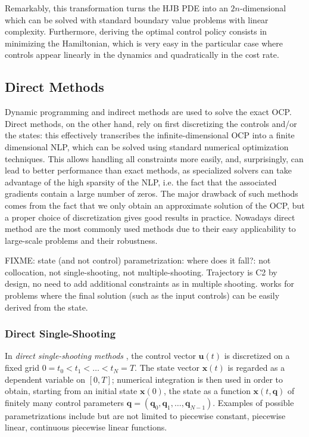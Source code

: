 Remarkably, this transformation turns the HJB PDE into an
$2n$-dimensional which can be solved with standard boundary value
problems with linear complexity. Furthermore, deriving the optimal
control policy consists in minimizing the Hamiltonian, which is very
easy in the particular case where controls appear linearly in the
dynamics and quadratically in the cost rate.

\subsection{Direct Methods}
\label{subsec:chap3-direct-methods}

Dynamic programming and indirect methods are used to solve the exact
OCP. Direct methods, on the other hand, rely on first discretizing the
controls and/or the states: this effectively transcribes the
infinite-dimensional OCP into a finite dimensional NLP, which can be
solved using standard numerical optimization techniques. This allows
handling all constraints more easily, and, surprisingly, can lead to
better performance than exact methods, as specialized solvers can take
advantage of the high sparsity of the NLP, i.e. the fact that the
associated gradients contain a large number of zeros. The major
drawback of such methods comes from the fact that we only obtain an
approximate solution of the OCP, but a proper choice of discretization
gives good results in practice. Nowadays direct method are the most
commonly used methods due to their easy applicability to large-scale
problems and their robustness.

FIXME: state (and not control) parametrization: where does it fall?:
not collocation, not single-shooting, not
multiple-shooting. Trajectory is C2 by design, no need to add
additional constraints as in multiple shooting. works for problems
where the final solution (such as the input controls) can be easily
derived from the state. \cite{sirinesa1981}

\subsubsection{Direct Single-Shooting}

In \emph{direct single-shooting methods}
\cite{hicks1971approximation,sargent1978development}, the control
vector $\mathbf{u}(t)$ is discretized on a fixed grid
$0=t_0<t_1<\ldots<t_N=T$. The state vector $\mathbf{x}(t)$ is regarded
as a dependent variable on $[0,T]$; numerical integration is then used
in order to obtain, starting from an initial state $\mathbf{x}(0)$,
the state as a function $\mathbf{x}(t,\mathbf{q})$ of finitely many
control parameters
$\mathbf{q}=(\mathbf{q}_0,\mathbf{q}_1,\ldots,\mathbf{q}_{N-1})$. Examples
of possible parametrizations include but are not limited to piecewise
constant, piecewise linear, continuous piecewise linear functions.

